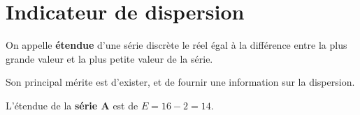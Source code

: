 \section{Indicateur de dispersion}

\begin{definition}[Étendue]
   On appelle \textbf{étendue} d'une série discrète le réel égal à la différence entre la plus grande valeur et la plus petite valeur de la série.
\end{definition}

\bigskip

Son principal mérite est d'exister, et de fournir une information sur la dispersion.

\begin{exemple*1}
   L'étendue de la \textbf{série A} est de $E=16-2=14$.
\end{exemple*1}


%



\activites

